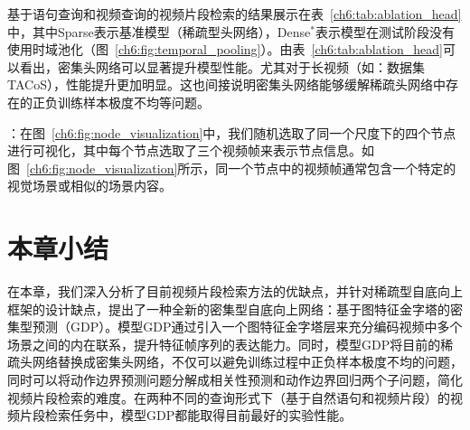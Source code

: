 基于语句查询和视频查询的视频片段检索的结果展示在表~\ref{ch6:tab:ablation_head}中，其中Sparse表示基准模型（稀疏型头网络），Dense$^*$表示模型在测试阶段没有使用时域池化（图~\ref{ch6:fig:temporal_pooling}）。由表~\ref{ch6:tab:ablation_head}可以看出，密集头网络可以显著提升模型性能。尤其对于长视频（如：数据集TACoS），性能提升更加明显。这也间接说明密集头网络能够缓解稀疏头网络中存在的正负训练样本极度不均等问题。


\textbf{}：在图~\ref{ch6:fig:node_visualization}中，我们随机选取了同一个尺度下的四个节点进行可视化，其中每个节点选取了三个视频帧来表示节点信息。如图~\ref{ch6:fig:node_visualization}所示，同一个节点中的视频帧通常包含一个特定的视觉场景或相似的场景内容。

\section{本章小结}
在本章，我们深入分析了目前视频片段检索方法的优缺点，并针对稀疏型自底向上框架的设计缺点，提出了一种全新的密集型自底向上网络：基于图特征金字塔的密集型预测（GDP）。模型GDP通过引入一个图特征金字塔层来充分编码视频中多个场景之间的内在联系，提升特征帧序列的表达能力。同时，模型GDP将目前的稀疏头网络替换成密集头网络，不仅可以避免训练过程中正负样本极度不均的问题，同时可以将动作边界预测问题分解成相关性预测和动作边界回归两个子问题，简化视频片段检索的难度。在两种不同的查询形式下（基于自然语句和视频片段）的视频片段检索任务中，模型GDP都能取得目前最好的实验性能。
